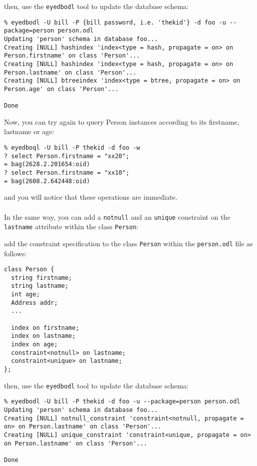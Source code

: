 \normalsize
\item then, use the \texttt{eyedbodl} tool to update the database schema:
\verbsize \begin{verbatim}
% eyedbodl -U bill -P {bill password, i.e. 'thekid'} -d foo -u --package=person person.odl
Updating 'person' schema in database foo...
Creating [NULL] hashindex 'index<type = hash, propagate = on> on Person.firstname' on class 'Person'...
Creating [NULL] hashindex 'index<type = hash, propagate = on> on Person.lastname' on class 'Person'...
Creating [NULL] btreeindex 'index<type = btree, propagate = on> on Person.age' on class 'Person'...

Done
\end{verbatim}
\normalsize
\ee
Now, you can try again to query Person instances according to its
firstname, lastname or age:
\verbsize \begin{verbatim}
% eyedboql -U bill -P thekid -d foo -w
? select Person.firstname = "xx20";
= bag(2628.2.201654:oid)
? select Person.firstname = "xx10";
= bag(2608.2.642448:oid)
\end{verbatim}
\normalsize
and you will notice that these operations are immediate.
\\
\\
In the same way, you can add a \texttt{notnull} and an \texttt{unique} constraint
on the \texttt{lastname} attribute within the class \texttt{Person}:
\be
\item add the constraint specification to the class \texttt{Person} within
the \texttt{person.odl} file as follows:
\verbsize \begin{verbatim}
class Person {
  string firstname;
  string lastname;
  int age;
  Address addr;
  ...

  index on firstname;
  index on lastname;
  index on age;
  constraint<notnull> on lastname;
  constraint<unique> on lastname;
};
\end{verbatim}
\normalsize
\item then, use the \texttt{eyedbodl} tool to update the database schema:
\verbsize \begin{verbatim}
% eyedbodl -U bill -P thekid -d foo -u --package=person person.odl
Updating 'person' schema in database foo...
Creating [NULL] notnull_constraint 'constraint<notnull, propagate = on> on Person.lastname' on class 'Person'...
Creating [NULL] unique_constraint 'constraint<unique, propagate = on> on Person.lastname' on class 'Person'...

Done
\end{verbatim}
